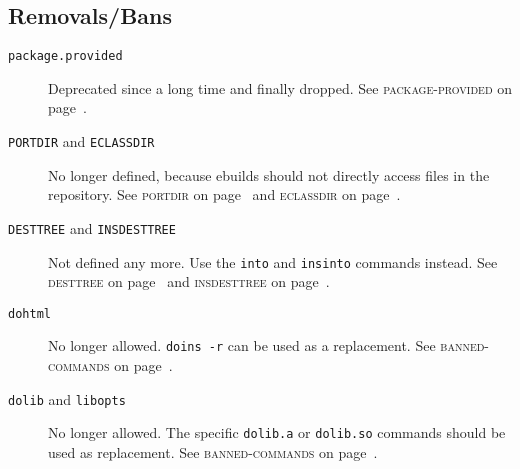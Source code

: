 \documentclass[a4paper,nofoldmark]{leaflet}
\newcommand{\code}[1]{\texttt{#1}}
\newcommand{\featureref}[1]{\textsc{#1} on page~\pageref{feat:#1}}
\begin{document}
\subsection{Removals/Bans}
\label{sec:cs:eapi7-removalsbans}
\begin{description}
    \item[\code{package.provided}] Deprecated since a long time and
    finally dropped.
    See \featureref{package-provided}.
    \item[\code{PORTDIR} and \code{ECLASSDIR}] No longer defined,
    because ebuilds should not directly access files in the repository.
    See \featureref{portdir} and \featureref{eclassdir}.
    \item[\code{DESTTREE} and \code{INSDESTTREE}] Not defined any
    more. Use the \code{into} and \code{insinto} commands instead.
    See \featureref{desttree} and \featureref{insdesttree}.
    \item[\code{dohtml}] No longer allowed. \code{doins -r} can be
    used as a replacement.
    See \featureref{banned-commands}.
    \item[\code{dolib} and \code{libopts}] No longer allowed.
    The specific \code{dolib.a} or \code{dolib.so} commands should be
    used as replacement.
    See \featureref{banned-commands}.
\end{description}
\end{document}
